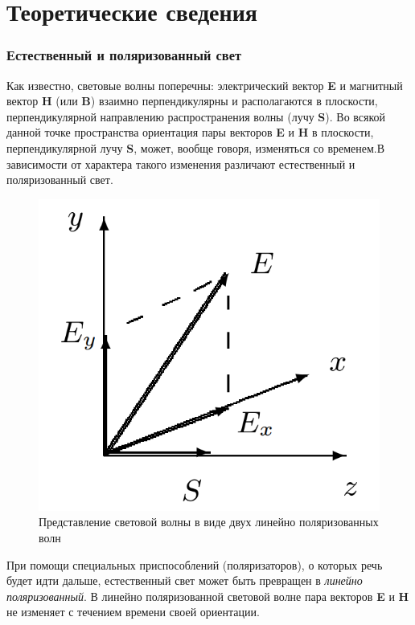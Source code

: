\documentclass[a4paper,12pt]{article}
\begin{document}
\section*{Теоретические сведения}

\subsubsection*{Естественный и поляризованный свет}

Как известно, световые волны поперечны: электрический вектор \textbf{E} и магнитный вектор \textbf{H} (или \textbf{B}) взаимно перпендикулярны и располагаются в плоскости, перпендикулярной направлению распространения волны (лучу \textbf{S}). Во всякой данной точке пространства ориентация пары векторов \textbf{E} и \textbf{H} в плоскости, перпендикулярной лучу \textbf{S}, может, вообще говоря, изменяться со временем.В зависимости от характера такого изменения различают естественный и поляризованный свет.

\begin{figure} 
	\includegraphics[width=\linewidth]{fig1}
	\caption{Представление световой волны в виде двух линейно поляризованных волн}
\end{figure}


При помощи специальных приспособлений (поляризаторов), о которых речь будет идти дальше, естественный свет может быть превращен в \textit{линейно поляризованный}. В линейно поляризованной световой волне пара векторов \textbf{E} и \textbf{H} не изменяет с течением времени своей ориентации.
\end{document}
